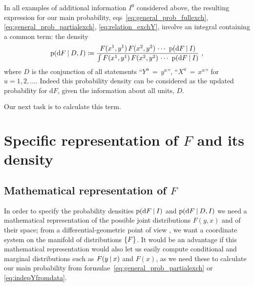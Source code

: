 \documentclass[\ifafour a4paper,12pt,\else a5paper,10pt,\fi%
onecolumn,oneside,article,%
british%
]{memoir}
\theoremstyle{remark}
\theoremstyle{innote}
\newcommand*{\di}{\mathrm{d}}%
\newcommand*{\defd}{\coloneqq}
\DeclarePairedDelimiter\set{\{}{\}} %
\newcommand*{\p}{\mathrm{p}}%
\renewcommand*{\|}[1][]{\nonscript\:#1\vert\nonscript\:\mathopen{}}
\newcommand*{\mo}[1][=]{\mathord{\,#1\,}}
\newcommand*{\eqns}{eqs}%
\newcommand*{\prop}[1]{\enquote{\textsf{#1}}}%
\begin{document}
In all examples of additional information $I^{0}$ considered above, the resulting expression for our main probability, \eqns~\eqref{eq:general_prob_fullexch}, \eqref{eq:general_prob_partialexch}, \eqref{eq:relation_exchY}, involve an integral containing a common term: the density
\begin{equation}
  \label{eq:common_density}
  \p(\di F \|D,I) \defd
    \frac{
    F(x^{1},y^{1})\,F(x^{2},y^{2})\,\dotsm\  \p(\di F\| I)
  }{
   \int F(x^{1},y^{1})\,F(x^{2},y^{2})\,\dotsm\  \p(\di F \|I)
  } \ ,
\end{equation}
where $D$ is the conjunction of all statements \prop{$Y^{u}\mo y^{u}$}, \prop{$X^{u}\mo x^{u}$} for $u=1,2,\dotsc$. Indeed this probability density can be considered as the updated probability for $\di F$, given the information about all units, $D$.

Our next task is to calculate this term.


\chapter{Specific representation of $F$ and its density}
\label{cha:repres_F}

\section{Mathematical representation of $F$}
\label{sec:repr_F_convexsum}


In order to specify the probability densities $\p(\di F \| I)$ and $\p(\di F \| D, I)$ we need a mathematical representation of the possible joint distributions $F(y,x)$ and of their space; from a differential-geometric point of view \autocites[III.A, VII.A]{choquetbruhatetal1977_r1996}, we want a coordinate system on the manifold of distributions $\set{F}$. It would be an advantage if this mathematical representation would also let us easily compute conditional and marginal distributions such as $F(y\| x)$ and $F(x)$, as we need these to calculate our main probability from formulae~\eqref{eq:general_prob_partialexch} or \eqref{eq:indepYfromdata}.
\end{document}
